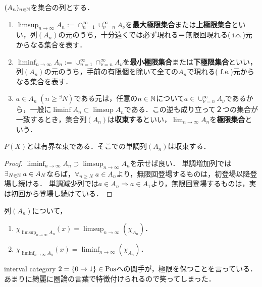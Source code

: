 \documentclass[uplatex, dvipdfmx]{jsreport}
\begin{document}
\begin{definition}
    $(A_n)_{n\in\mathbb{N}}$を集合の列とする．
    \begin{enumerate}
        \item $\limsup_{n\to\infty}A_n:=\cap^\infty_{n=1}\cup^\infty_{\nu=n}A_\nu$を\textbf{最大極限集合}または\textbf{上極限集合}といい，列$(A_n)$の元のうち，十分遠くでは必ず現れる＝無限回現れる($\;\mathrm{i.o.}$)元からなる集合を表す．
        \item $\liminf_{n\to\infty}A_n:=\cup^\infty_{n=1}\cap^\infty_{\nu=n}A_\nu$を\textbf{最小極限集合}または\textbf{下極限集合}といい，列$(A_n)$の元のうち，手前の有限個を除いて全ての$A_n$で現れる($\;\mathrm{f.e.}$)元からなる集合を表す．
        \item $a\in A_n\;(n\ge{}^\exists N)$である元は，任意の$n\in\mathbb{N}$について$a\in\cup_{\nu=n}^\infty A_\nu$であるから，一般に$\liminf A_n\subset\limsup A_n$である．この逆も成り立って２つの集合が一致するとき，集合列$(A_n)$は\textbf{収束する}といい，$\lim_{n\to\infty}A_n$を\textbf{極限集合}という．
    \end{enumerate}
\end{definition}

\begin{lemma}[有界な単調列は収束する]\label{lemma-monotone-convergence}
    $P(X)$とは有界な束である．そこでの単調列$(A_n)$は収束する．
\end{lemma}
\begin{proof}
    $\liminf_{n\to\infty}A_n\supset\limsup_{n\to\infty}A_n$を示せば良い．
    単調増加列では$\exists_{N\in\mathbb{N}}\;a\in A_N$ならば，$\forall_{n\ge N}\;a\in A_n$より，無限回登場するものは，初登場以降登場し続ける．
    単調減少列では$a\in A_n\Rightarrow a\in A_1$より，無限回登場するものは，実は初回から登場し続けている．
\end{proof}

\begin{lemma}[極限集合の特性関数]
    列$(A_n)$について，
    \begin{enumerate}
        \item $\chi_{\limsup_{n\to\infty}A_n}(x)=\limsup_{n\to\infty}(\chi_{A_n})$．
        \item $\chi_{\liminf_{n\to\infty}A_n}(x)=\liminf_{n\to\infty}(\chi_{A_n})$．
    \end{enumerate}
\end{lemma}
\begin{remarks}
    interval category $2=\{0\to 1\}\in\mathrm{Pos}$への関手が，極限を保つことを言っている．
    あまりに綺麗に圏論の言葉で特徴付けられるので笑ってしまった．
\end{remarks}
\end{document}
